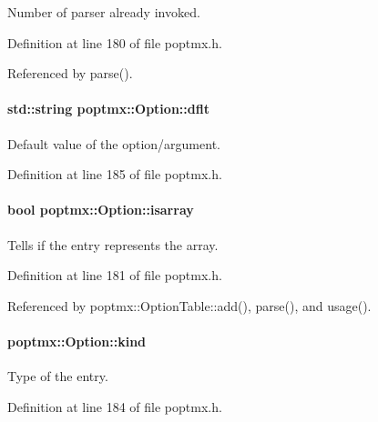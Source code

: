Number of parser already invoked. 



Definition at line 180 of file poptmx.h.



Referenced by parse().

\hypertarget{classpoptmx_1_1Option_a53c0a40e85e0fb07ed3a368df315f69f}{
\paragraph[{dflt}]{\setlength{\rightskip}{0pt plus 5cm}std::string {\bf poptmx::Option::dflt}}\hfill}
\label{classpoptmx_1_1Option_a53c0a40e85e0fb07ed3a368df315f69f}


Default value of the option/argument. 



Definition at line 185 of file poptmx.h.

\hypertarget{classpoptmx_1_1Option_ab87e428e65c1d4c16fc8ba9952d950bb}{
\paragraph[{isarray}]{\setlength{\rightskip}{0pt plus 5cm}bool {\bf poptmx::Option::isarray}}\hfill}
\label{classpoptmx_1_1Option_ab87e428e65c1d4c16fc8ba9952d950bb}


Tells if the entry represents the array. 



Definition at line 181 of file poptmx.h.



Referenced by poptmx::OptionTable::add(), parse(), and usage().

\hypertarget{classpoptmx_1_1Option_a5f5719adfad302943da528300914bd8e}{
\paragraph[{kind}]{ {\bf poptmx::Option::kind}}\hfill}
\label{classpoptmx_1_1Option_a5f5719adfad302943da528300914bd8e}
Type of the entry. 

Definition at line 184 of file poptmx.h.



